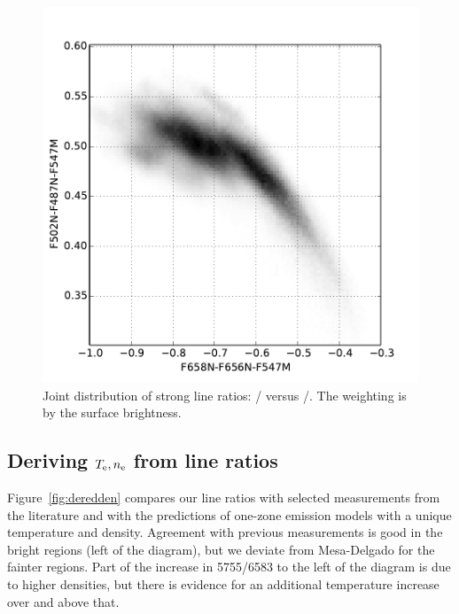 \documentclass[preprint]{aastex}
\begin{document}
\begin{figure}[p]
  \center
  \includegraphics{ratio-correl-BPT}
  \caption{Joint distribution of strong line ratios: \oiii{}/\hb{}
  versus \nii{}/\ha{}.  The weighting is by the \ha{} surface brightness.}
  \label{fig:BPT}
\end{figure}

\clearpage
\subsection{\boldmath Deriving \(T_{\mathrm{e}}, n_{\mathrm{e}}\) from line ratios}
\label{sec:derive}

Figure~\ref{fig:deredden} compares our line ratios with selected
measurements from the literature and with the predictions of one-zone
emission models with a unique temperature and density.  Agreement with
previous measurements is good in the bright regions (left of the
diagram), but we deviate from Mesa-Delgado for the fainter regions.
Part of the increase in 5755/6583 to the left of the diagram is due to
higher densities, but there is evidence for an additional temperature
increase over and above that.
\end{document}
